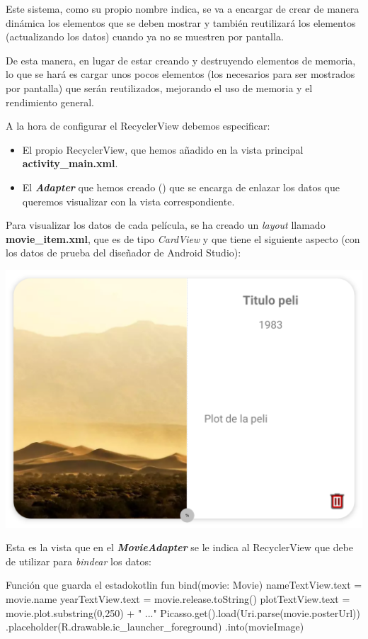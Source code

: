 \documentclass{\ClassPath/viu-tfm-template}
\begin{document}
Este sistema, como su propio nombre indica, se va a encargar de crear de manera dinámica los elementos que se deben mostrar y también reutilizará los elementos (actualizando los datos) cuando ya no se muestren por pantalla.

De esta manera, en lugar de estar creando y destruyendo elementos de memoria, lo que se hará es cargar unos pocos elementos (los necesarios para ser mostrados por pantalla) que serán reutilizados, mejorando el uso de memoria y el rendimiento general.

A la hora de configurar el RecyclerView debemos especificar:
\begin{itemize}
    \item El propio RecyclerView, que hemos añadido en la vista principal \textbf{activity\_main.xml}.

    \item El \textit{\textbf{Adapter}} que hemos creado () que se encarga de enlazar los datos que queremos visualizar con la vista correspondiente.
\end{itemize}

Para visualizar los datos de cada película, se ha creado un \textit{layout} llamado \textbf{movie\_item.xml}, que es de tipo \textit{CardView} y que tiene el siguiente aspecto (con los datos de prueba del diseñador de Android Studio):

\begin{center}
    \vspace{-15pt}
    \includegraphics[width=0.6\linewidth]{img/movie_item.png}
    \vspace{-20pt}
\end{center}

Esta es la vista que en el \textbf{\textit{MovieAdapter}} se le indica al RecyclerView que debe de utilizar para \textit{bindear} los datos:

\begin{mycode}{Función que guarda el estado}{kotlin}{}
fun bind(movie: Movie) {
    nameTextView.text = movie.name
    yearTextView.text = movie.release.toString()
    plotTextView.text = movie.plot.substring(0,250) + " ..."
    Picasso.get().load(Uri.parse(movie.posterUrl))
        .placeholder(R.drawable.ic_launcher_foreground)
       .into(movieImage)
}
\end{mycode}
\end{document}
